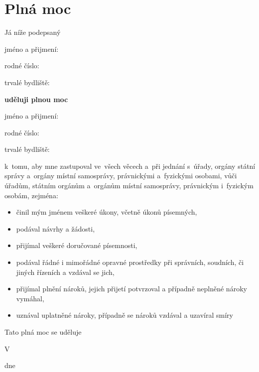 \documentclass{article}
\newcommand\HandwrittenText[1]{%
  \parbox[t]{#1}{%
    \centering
    \dotfill\par
    \nointerlineskip\vspace{2pt}
  }%
}
\begin{document}

\section*{\centering Plná moc}
Já níže podepsaný \par
jméno a přijmení:\HandwrittenText{5cm}{} \par
 rodné číslo:\HandwrittenText{6cm}{} \par
 trvalé bydliště:\HandwrittenText{5.43cm}{} \par
 \HandwrittenText{7.75cm}{} \par
\begin{center}
  \textbf{uděluji plnou moc}
\end{center}
 jméno a přijmení:\HandwrittenText{5cm}{} \par
 rodné číslo:\HandwrittenText{6cm}{} \par
 trvalé bydliště:\HandwrittenText{5.43cm}{} \par
 \HandwrittenText{7.75cm}{} \par
 \vskip 0.5cm
k~tomu, aby mne zastupoval ve~všech věcech a~při jednání s~úřady, orgány státní správy a~orgány místní samosprávy, právnickými a~fyzickými osobami, vůči úřadům, státním orgánům a~orgánům místní samosprávy, právnickým i~fyzickým osobám, zejména:

\begin{itemize}
    \setlength\itemsep{-0.15cm}
  \item činil mým jménem veškeré úkony, včetně úkonů písemných,
  \item podával návrhy a žádosti,
  \item přijímal veškeré doručované písemnosti,
  \item podával řádné i mimořádné opravné prostředky při správních, soudních, či jiných řízeních a vzdával se jich,
  \item přijímal plnění nároků, jejich přijetí potvrzoval a případně neplněné nároky vymáhal,
  \item uznával uplatněné nároky, případně se nároků vzdával a uzavíral smíry
    \vskip 2cm
\end{itemize}

Tato plná moc se uděluje \HandwrittenText{5cm}
\vskip 2cm
V \HandwrittenText{3cm} dne \HandwrittenText{3cm} \\
\HandwrittenText{7.2cm}
\end{document}
